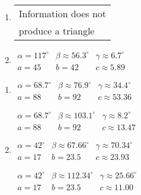 \documentclass{ximera}
\begin{document}
\begin{multicols}{2} 

\begin{enumerate}

\setcounter{enumi}{\value{HW}}

\item \begin{tabular}{l}
Information does not \\
produce a triangle \end{tabular}

\item $\begin{array}{lll}
\alpha = 117^{\circ} & \beta \approx 56.3^{\circ} & \gamma \approx 6.7^{\circ} \\
a = 45 & b = 42 & c \approx 5.89 \end{array}$

\setcounter{HW}{\value{enumi}}

\end{enumerate}

\end{multicols}

\begin{multicols}{2} 

\begin{enumerate}

\setcounter{enumi}{\value{HW}}

\item $\begin{array}{lll}
\alpha = 68.7^{\circ} & \beta \approx 76.9^{\circ} & \gamma \approx 34.4^{\circ} \\
a = 88 & b = 92 & c \approx 53.36 \end{array}$

$\begin{array}{lll}
\alpha = 68.7^{\circ} & \beta \approx 103.1^{\circ} & \gamma \approx 8.2^{\circ} \\
a = 88 & b = 92 & c \approx 13.47\end{array}$

\item $\begin{array}{lll}
\alpha = 42^{\circ} & \beta \approx 67.66^{\circ} & \gamma \approx 70.34^{\circ} \\
a = 17 & b = 23.5 & c \approx 23.93 \end{array}$

$\begin{array}{lll}
\alpha = 42^{\circ} & \beta \approx 112.34^{\circ} & \gamma \approx 25.66^{\circ} \\
a = 17 & b = 23.5 & c \approx 11.00 \end{array}$

\setcounter{HW}{\value{enumi}}

\end{enumerate}

\end{multicols}
\end{document}
